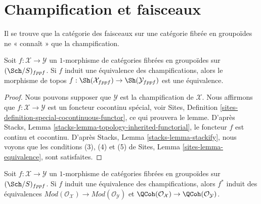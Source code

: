 \section{Champification et faisceaux}
\label{section-stackification}

\noindent
Il se trouve que la catégorie des faisceaux sur une catégorie fibrée en
groupoïdes ne « connaît » que la champification.

\begin{lemma}
\label{lemma-stackification}
Soit $f : \mathcal{X} \to \mathcal{Y}$ un $1$-morphisme de catégories
fibrées en groupoïdes sur $(\Sch/S)_{fppf}$. Si
$f$ induit une équivalence des champifications, alors le morphisme
de topos
$f : \Sh(\mathcal{X}_{fppf}) \to \Sh(\mathcal{Y}_{fppf})$
est une équivalence.
\end{lemma}

\begin{proof}
Nous pouvons supposer que $\mathcal{Y}$ est la champification de $\mathcal{X}$.
Nous affirmons que $f : \mathcal{X} \to \mathcal{Y}$ est un foncteur
cocontinu spécial, voir
Sites, Definition \ref{sites-definition-special-cocontinuous-functor},
ce qui prouvera le lemme. D'après
Stacks, Lemma \ref{stacks-lemma-topology-inherited-functorial},
le foncteur $f$ est continu et cocontinu. D'après
Stacks, Lemma \ref{stacks-lemma-stackify},
nous voyons que les conditions (3), (4) et (5) de
Sites, Lemma \ref{sites-lemma-equivalence},
sont satisfaites.
\end{proof}

\begin{lemma}
\label{lemma-stackification-quasi-coherent}
Soit $f : \mathcal{X} \to \mathcal{Y}$ un $1$-morphisme de catégories
fibrées en groupoïdes sur $(\Sch/S)_{fppf}$. Si
$f$ induit une équivalence des champifications, alors $f^*$
induit des équivalences
$\textit{Mod}(\mathcal{O}_\mathcal{X}) \to
\textit{Mod}(\mathcal{O}_\mathcal{Y})$
et
$\QCoh(\mathcal{O}_\mathcal{X}) \to
\QCoh(\mathcal{O}_\mathcal{Y})$.
\end{lemma}

